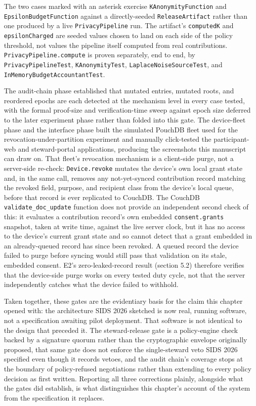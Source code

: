 The two cases marked with an asterisk exercise \texttt{KAnonymityFunction} and \texttt{EpsilonBudgetFunction} against a directly-seeded \texttt{ReleaseArtifact} rather than one produced by a live \texttt{PrivacyPipeline} run. The artifact's \texttt{computedK} and \texttt{epsilonCharged} are seeded values chosen to land on each side of the policy threshold, not values the pipeline itself computed from real contributions. \texttt{PrivacyPipeline.compute} is proven separately, end to end, by \texttt{PrivacyPipelineTest}, \texttt{KAnonymityTest}, \texttt{LaplaceNoiseSourceTest}, and \texttt{InMemoryBudgetAccountantTest}.

The audit-chain phase established that mutated entries, mutated roots, and reordered epochs are each detected at the mechanism level in every case tested, with the formal proof-size and verification-time sweep against epoch size deferred to the later experiment phase rather than folded into this gate. The device-fleet phase and the interface phase built the simulated PouchDB fleet used for the revocation-under-partition experiment and manually click-tested the participant-web and steward-portal applications, producing the screenshots this manuscript can draw on. That fleet's revocation mechanism is a client-side purge, not a server-side re-check: \texttt{Device.revoke} mutates the device's own local grant state and, in the same call, removes any not-yet-synced contribution record matching the revoked field, purpose, and recipient class from the device's local queue, before that record is ever replicated to CouchDB. The CouchDB \texttt{validate\_doc\_update} function does not provide an independent second check of this: it evaluates a contribution record's own embedded \texttt{consent.grants} snapshot, taken at write time, against the live server clock, but it has no access to the device's current grant state and so cannot detect that a grant embedded in an already-queued record has since been revoked. A queued record the device failed to purge before syncing would still pass that validation on its stale, embedded consent. E2's zero-leaked-record result (section 5.2) therefore verifies that the device-side purge works on every tested duty cycle, not that the server independently catches what the device failed to withhold.

Taken together, these gates are the evidentiary basis for the claim this chapter opened with: the architecture SIDS 2026 sketched is now real, running software, not a specification awaiting pilot deployment. That software is not identical to the design that preceded it. The steward-release gate is a policy-engine check backed by a signature quorum rather than the cryptographic envelope originally proposed, that same gate does not enforce the single-steward veto SIDS 2026 specified even though it records vetoes, and the audit chain's coverage stops at the boundary of policy-refused negotiations rather than extending to every policy decision as first written. Reporting all three corrections plainly, alongside what the gates did establish, is what distinguishes this chapter's account of the system from the specification it replaces.
